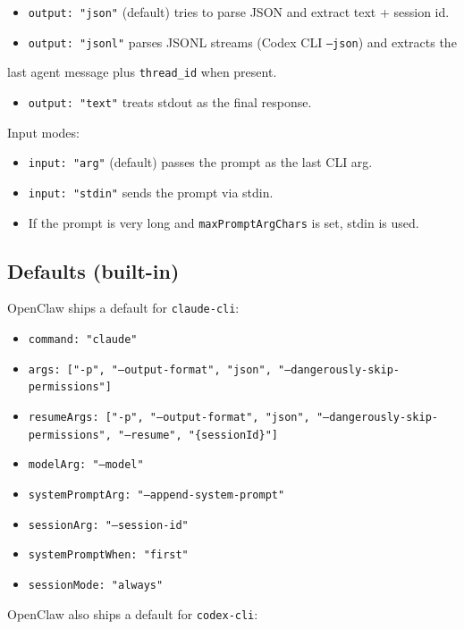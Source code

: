 \begin{itemize}
  \item \texttt{output: "json"} (default) tries to parse JSON and extract text + session id.
  \item \texttt{output: "jsonl"} parses JSONL streams (Codex CLI \texttt{--json}) and extracts the
\end{itemize}

last agent message plus \texttt{thread\_id} when present.
\begin{itemize}
  \item \texttt{output: "text"} treats stdout as the final response.
\end{itemize}


Input modes:

\begin{itemize}
  \item \texttt{input: "arg"} (default) passes the prompt as the last CLI arg.
  \item \texttt{input: "stdin"} sends the prompt via stdin.
  \item If the prompt is very long and \texttt{maxPromptArgChars} is set, stdin is used.
\end{itemize}


\subsection{Defaults (built-in)}


OpenClaw ships a default for \texttt{claude-cli}:

\begin{itemize}
  \item \texttt{command: "claude"}
  \item \texttt{args: ["-p", "--output-format", "json", "--dangerously-skip-permissions"]}
  \item \texttt{resumeArgs: ["-p", "--output-format", "json", "--dangerously-skip-permissions", "--resume", "\{sessionId\}"]}
  \item \texttt{modelArg: "--model"}
  \item \texttt{systemPromptArg: "--append-system-prompt"}
  \item \texttt{sessionArg: "--session-id"}
  \item \texttt{systemPromptWhen: "first"}
  \item \texttt{sessionMode: "always"}
\end{itemize}


OpenClaw also ships a default for \texttt{codex-cli}:

